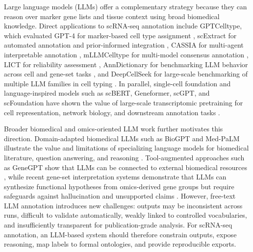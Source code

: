 \documentclass[referee,lineno,pdflatex]{sn-jnl}
\begin{document}
Large language models (LLMs) offer a complementary strategy because they can reason over marker gene lists and tissue context using broad biomedical knowledge. Direct applications to scRNA-seq annotation include GPTCelltype, which evaluated GPT-4 for marker-based cell type assignment \cite{hou2024gpt4}, scExtract for automated annotation and prior-informed integration \cite{wu2025scextract}, CASSIA for multi-agent interpretable annotation \cite{xie2025cassia}, mLLMCelltype for multi-model consensus annotation \cite{yang2026mllmcelltype}, LICT for reliability assessment \cite{ye2025lict}, AnnDictionary for benchmarking LLM behavior across cell and gene-set tasks \cite{crowley2025anndictionary}, and DeepCellSeek for large-scale benchmarking of multiple LLM families in cell typing \cite{xiao2025deepcellseek}. In parallel, single-cell foundation and language-inspired models such as scBERT, Geneformer, scGPT, and scFoundation have shown the value of large-scale transcriptomic pretraining for cell representation, network biology, and downstream annotation tasks \cite{yang2022scbert,theodoris2023geneformer,cui2024scgpt,hao2024scfoundation}.

Broader biomedical and omics-oriented LLM work further motivates this direction. Domain-adapted biomedical LLMs such as BioGPT and Med-PaLM illustrate the value and limitations of specializing language models for biomedical literature, question answering, and reasoning \cite{luo2022biogpt,singhal2023medpalm}. Tool-augmented approaches such as GeneGPT show that LLMs can be connected to external biomedical resources \cite{jin2024genegpt}, while recent gene-set interpretation systems demonstrate that LLMs can synthesize functional hypotheses from omics-derived gene groups but require safeguards against hallucination and unsupported claims \cite{hu2025genesetllm,wang2025geneagent}. However, free-text LLM annotation introduces new challenges: outputs may be inconsistent across runs, difficult to validate automatically, weakly linked to controlled vocabularies, and insufficiently transparent for publication-grade analysis. For scRNA-seq annotation, an LLM-based system should therefore constrain outputs, expose reasoning, map labels to formal ontologies, and provide reproducible exports.
\end{document}
